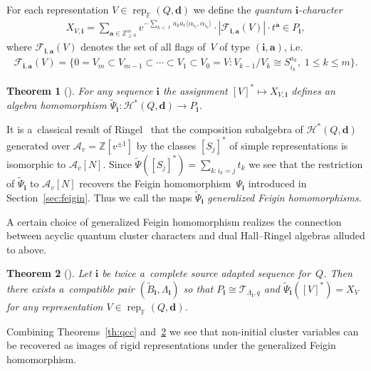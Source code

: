 \documentclass[pdftex]{sigma}
\numberwithin{equation}{section}
\newtheorem{Theorem}{Theorem}[section]
\begin{document}
For each representation $V\in\operatorname{rep}_\mathbb{F}(Q,\mathbf{d})$ we def\/ine the \emph{quantum $\mathbf{i}$-character}
\begin{gather*}
X_{V,\mathbf{i}}=\sum\limits_{\mathbf{a}\in\mathbb{Z}_{\ge0}^m}v^{-\sum\limits_{k<\ell}
a_ka_\ell\langle\alpha_{i_\ell},\alpha_{i_k}\rangle}\cdot |\mathcal{F}_{\mathbf{i},\mathbf{a}}(V)|\cdot t^\mathbf{a}\in P_\mathbf{i},
\end{gather*}
where $\mathcal{F}_{\mathbf{i},\mathbf{a}}(V)$ denotes the set of all f\/lags of~$V$ of type $(\mathbf{i},\mathbf{a})$,
i.e.
\begin{gather*}
\mathcal{F}_{\mathbf{i},\mathbf{a}}(V)=\{0=V_m\subset V_{m-1}\subset\cdots\subset V_1\subset V_0=V: V_{k-1}/V_k\cong
S_{i_k}^{a_k},\; 1\le k\le m\}.
\end{gather*}

\begin{Theorem}[\cite{berenstein-rupel}]
\label{th:feigin_character}
For any sequence $\mathbf{i}$ the assignment $[V]^*\mapsto X_{V,\mathbf{i}}$ defines an algebra homomorphism
$\widetilde\Psi_\mathbf{i}: \mathcal{H}^*(Q,\mathbf{d})\to P_\mathbf{i}$.
\end{Theorem}

It is a~classical result of Ringel~\cite{ringel2} that the composition subalgebra of $\mathcal{H}^*(Q,\mathbf{d})$
generated over $\mathcal{A}_v=\mathbb{Z}[v^{\pm1}]$ by the classes $[S_j]^*$ of simple representations is isomorphic to
$\mathcal{A}_v[N]$.
Since $\tilde\Psi([S_j]^*)=\sum\limits_{k:i_k=j}t_k$ we see that the restriction of $\widetilde\Psi_\mathbf{i}$ to
$\mathcal{A}_v[N]$ recovers the Feigin homomor\-phism~$\Psi_\mathbf{i}$ introduced in Section~\ref{sec:feigin}.
Thus we call the maps $\widetilde\Psi_\mathbf{i}$ \emph{generalized Feigin homomorphisms}.

A certain choice of generalized Feigin homomorphism realizes the connection between acyclic quantum cluster characters
and dual Hall--Ringel algebras alluded to above.
\begin{Theorem}[\cite{berenstein-rupel}]
\label{th:char}
Let $\mathbf{i}$ be twice a~complete source adapted sequence for~$Q$.
Then there exists a~compatible pair $(\widetilde B_\mathbf{i},\Lambda_\mathbf{i})$ so that
$P_\mathbf{i}\cong\mathcal{T}_{\Lambda_\mathbf{i},q}$ and $\widetilde\Psi_\mathbf{i}([V]^*)=X_V$ for any representation
$V\in\operatorname{rep}_\mathbb{F}(Q,\mathbf{d})$.
\end{Theorem}

Combining Theorems~\ref{th:qcc} and~\ref{th:char} we see that non-initial cluster variables can be recovered as images
of rigid representations under the generalized Feigin homomorphism.
\end{document}
